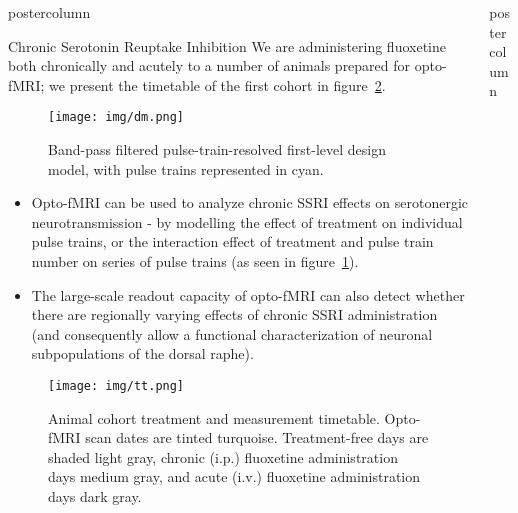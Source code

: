 \documentclass{beamer}
\begin{document}
\begin{frame}
\begin{columns}
\begin{column}{.43\textwidth}
\begin{beamercolorbox}[center]{postercolumn}
\begin{minipage}{.98\textwidth}
{\begin{myblock}{Chronic Serotonin Reuptake Inhibition}
						We are administering fluoxetine both chronically and acutely to a number of animals prepared for opto-fMRI; we present the timetable of the first cohort in figure~\ref{fig:tt}.
						\vspace{0.5em}
						\begin{figure}
							\begin{minipage}{0.94\textwidth}
								\centering\texttt{[image: img/dm.png]}
								\caption{Band-pass filtered pulse-train-resolved first-level design model, with pulse trains represented in cyan.}
								\label{fig:stim}
							\end{minipage}
						\end{figure}
						\begin{itemize}
							\item Opto-fMRI can be used to analyze chronic SSRI effects on serotonergic neurotransmission - by modelling the effect of treatment on individual pulse trains, or the interaction effect of treatment and pulse train number on series of pulse trains (as seen in figure~\ref{fig:stim}).
						 	\item The large-scale readout capacity of opto-fMRI can also detect whether there are regionally varying effects of chronic SSRI administration (and consequently allow a functional characterization of neuronal subpopulations of the dorsal raphe).
						\end{itemize}
						\vspace{0.5em}
						\begin{figure}
							\begin{minipage}{0.94\textwidth}
								\centering\texttt{[image: img/tt.png]}
								\caption{Animal cohort treatment and measurement timetable. Opto-fMRI scan dates are tinted turquoise. Treatment-free days are shaded light gray, chronic (i.p.) fluoxetine administration days medium gray, and acute (i.v.) fluoxetine administration days dark gray.}
								\label{fig:tt}
							\end{minipage}
						\end{figure}
					\end{myblock}\vfill
		}\end{minipage}\end{beamercolorbox}
	\end{column}
	\begin{column}{.57\textwidth}
		\begin{beamercolorbox}[center]{postercolumn}
			\begin{minipage}{.98\textwidth} %

\end{minipage}
\end{beamercolorbox}
\end{column}
\end{columns}
\end{frame}
\end{document}
